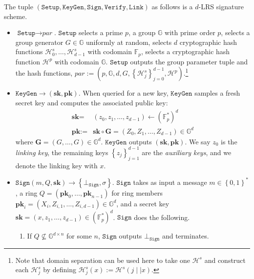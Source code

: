 \documentclass{llncs}
\begin{document}
\begin{definition}[$d$-CLSAG]\label{def:clsag}
The tuple $(\texttt{Setup}, \texttt{KeyGen}, \texttt{Sign}, \texttt{Verify}, \allowbreak \texttt{Link})$ as follows is a $d$-LRS signature scheme.

\begin{itemize}
\item $\texttt{Setup} \to \textit{par}$. $\texttt{Setup}$ selects a prime $p$, a group $\mathbb{G}$ with prime order $p$, selects a group generator $G \in \mathbb{G}$ uniformly at random, selects $d$ cryptographic hash functions $\mathcal{H}^s_0, \ldots, \mathcal{H}^s_{d-1}$ with codomain $\mathbb{F}_p$, selects a cryptographic hash function $\mathcal{H}^p$ with codomain $\mathbb{G}$. $\texttt{Setup}$ outputs the group parameter tuple and the hash functions, $\textit{par} := \left(p,\mathbb{G}, d, G, \left\{\mathcal{H}^s_j\right\}_{j=0}^{d-1}, \mathcal{H}^p\right)$.\footnote{Note that domain separation can be used here to take one $\mathcal{H}^s$ and construct each $\mathcal{H}^s_j$ by defining $\mathcal{H}^s_j(x) := \mathcal{H}^s(j \mid\mid x)$.}

\item $\texttt{KeyGen} \to (\textbf{sk}, \textbf{pk})$. When queried for a new key, $\texttt{KeyGen}$ samples a fresh secret key and computes the associated public key:
\begin{align*}
\textbf{sk} =& (z_0, z_1, \ldots, z_{d-1}) \leftarrow (\mathbb{F}_p^*)^d\\
\textbf{pk} :=& \textbf{sk} \circ \textbf{G} = (Z_0, Z_1, \ldots, Z_{d-1}) \in \mathbb{G}^d
\end{align*} where $\textbf{G} = (G, \ldots, G) \in \mathbb{G}^d$. $\texttt{KeyGen}$ outputs $(\textbf{sk}, \textbf{pk})$. We say $z_0$ is the \textit{linking key}, the remaining keys $\left\{z_j\right\}_{j=1}^{d-1}$ are the \textit{auxiliary keys}, and we denote the linking key with $x$.

\item $\texttt{Sign}\left(m, Q, \textbf{sk}\right) \to \left\{\bot_{\texttt{Sign}}, \sigma\right\}$. $\texttt{Sign}$ takes as input a message $m \in \left\{0,1\right\}^*$, a ring  $Q = (\textbf{pk}_0, \ldots, \textbf{pk}_{n-1})$ for ring members $\textbf{pk}_i = (X_i, Z_{i,1}, \ldots, Z_{i,d-1}) \in \mathbb{G}^d$, and a secret key $\textbf{sk} = (x,z_1, \ldots, z_{d-1}) \in (\mathbb{F}_p^*)^d$. $\texttt{Sign}$ does the following.

\begin{enumerate}
\item If $Q \not\subseteq \mathbb{G}^{d\times n}$ for some $n$, $\texttt{Sign}$ outputs $\bot_{\texttt{Sign}}$ and terminates.


\end{enumerate}
\end{itemize}
\end{definition}
\end{document}
